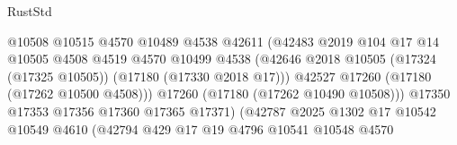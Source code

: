 \begin{lexlean}{RustStd}
\begin{coremodule}
                                              @10508
                                              @10515
                                              @4570
                                              @10489
                                              @4538
                                              @42611
                                              (@42483
                                                @2019
                                                @104
                                                @17
                                                @14
                                                @10505
                                                @4508
                                                @4519
                                                @4570
                                                @10499
                                                @4538
                                                (@42646
                                                  @2018
                                                  @10505
                                                  (@17324 (@17325 @10505))
                                                  (@17180 (@17330 @2018 @17)))
                                                @42527
                                                @17260
                                                (@17180 (@17262 @10500 @4508)))
                                              @17260
                                              (@17180 (@17262 @10490 @10508)))
                                            @17350
                                            @17353
                                            @17356
                                            @17360
                                            @17365
                                            @17371)
                                          (@42787
                                            @2025
                                            @1302
                                            @17
                                            @10542
                                            @10549
                                            @4610
                                            (@42794
                                              @429
                                              @17
                                              @19
                                              @4796
                                              @10541
                                              @10548
                                              @4570

\end{coremodule}
\end{lexlean}
